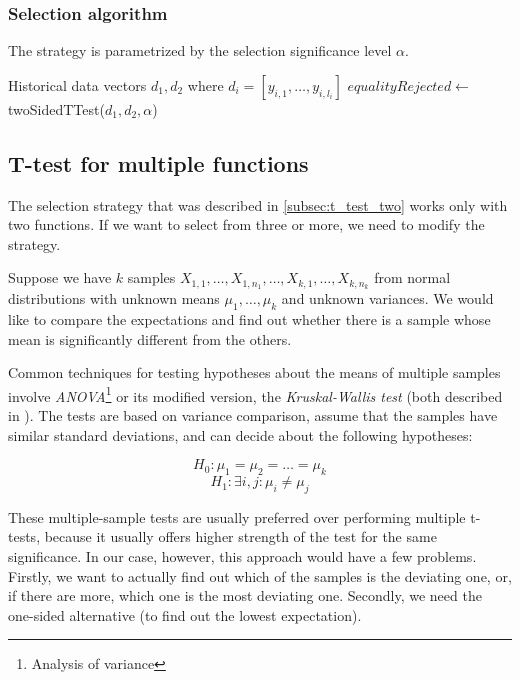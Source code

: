 \subsubsection{Selection algorithm}

The strategy is parametrized by the selection significance level $\alpha$.

\begin{algorithmic}[1] %
	\INPUT Historical data vectors $d_1,d_2$ where $d_i = [y_{i,1},\dots, y_{i,l_i}]$
	\State $equalityRejected \gets$ twoSidedTTest($d_1, d_2, \alpha$)
	\State {}
	\EndIf
	\State {}
	\Else 
	\State {}
	\EndIf
\end{algorithmic}

\subsection{T-test for multiple functions}
\label{subsec:t_test_multiple}

The selection strategy that was described in \ref{subsec:t_test_two} works only with two functions. If we want to select from three or more, we need to modify the strategy.

Suppose we have $k$ samples $X_{1,1}, \dots, X_{1, n_1}, \dots, X_{k,1}, \dots, X_{k, n_k}$ from normal distributions with unknown means $\mu_1, \dots, \mu_k$ and unknown variances. We would like to compare the expectations and find out whether there is a sample whose mean is significantly different from the others.

Common techniques for testing hypotheses about the means of multiple samples involve \textit{ANOVA}\footnote{Analysis of variance} or its modified version, the \textit{Kruskal-Wallis test} (both described in \cite{weiss_introductory_2010}). The tests are based on variance comparison, assume that the samples have similar standard deviations, and can decide about the following hypotheses:


\[
H_0: \mu_1 = \mu_2 = \dots = \mu_k
\]
\[
H_1: \exists i, j: \mu_i \neq \mu_j
\]

These multiple-sample tests are usually preferred over performing multiple t-tests, because it usually offers higher strength of the test for the same significance. In our case, however, this approach would have a few problems. Firstly, we want to actually find out which of the samples is the deviating one, or, if there are more, which one is the most deviating one. Secondly, we need the one-sided alternative (to find out the lowest expectation). 

